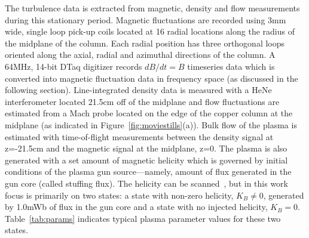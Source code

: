 \documentclass[aip,prl,amsmath,amssymb,reprint,superscriptaddress]{revtex4-1} %
\begin{document}
The turbulence data is extracted from magnetic, density and flow measurements during this stationary period. Magnetic fluctuations are recorded using 3mm wide, single loop pick-up coils located at 16 radial locations along the radius of the midplane of the column. Each radial position has three orthogonal loops oriented along the axial, radial and azimuthal directions of the column. A 64MHz, 14-bit DTaq digitizer records $dB/dt = \dot{B}$ timeseries data which is converted into magnetic fluctuation data in frequency space (as discussed in the following section). Line-integrated density data is measured with a HeNe interferometer located 21.5cm off of the midplane and flow fluctuations are estimated from a Mach probe located on the edge of the copper column at the midplane (as indicated in Figure~\ref{fig:moviestills}(a)). Bulk flow of the plasma is estimated with time-of-flight measurements between the density signal at z=-21.5cm and the magnetic signal at the midplane, z=0. The plasma is also generated with a set amount of magnetic helicity which is governed by initial conditions of the plasma gun source---namely, amount of flux generated in the gun core (called stuffing flux). The helicity can be scanned~\cite{schaffner14b}, but in this work focus is primarily on two states: a state with non-zero helicity, $K_{B}\neq 0$, generated by 1.0mWb of flux in the gun core and a state with no injected helicity, $K_{B}=0$. Table~\ref{tab:params} indicates typical plasma parameter values for these two states.




\end{document}
